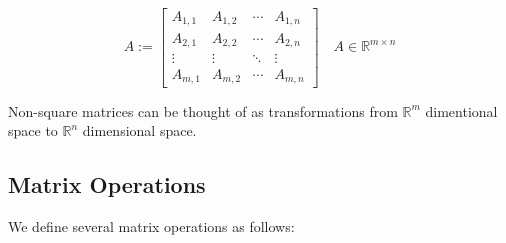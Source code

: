 \begin{equation}
    A := \begin{bmatrix} A_{1,1} & A_{1,2} & \cdots & A_{1,n} \\ A_{2,1} & A_{2,2} & \cdots & A_{2,n} \\ \vdots & \vdots & \ddots & \vdots \\ A_{m,1} & A_{m,2} & \cdots & A_{m,n} \end{bmatrix} \quad A \in \mathbb{R}^{m \times n}
\end{equation}


Non-square matrices can be thought of as transformations from $\mathbb{R}^m$ dimentional space to $\mathbb{R}^n$ dimensional space.

\subsection{Matrix Operations}

We define several matrix operations as follows:

